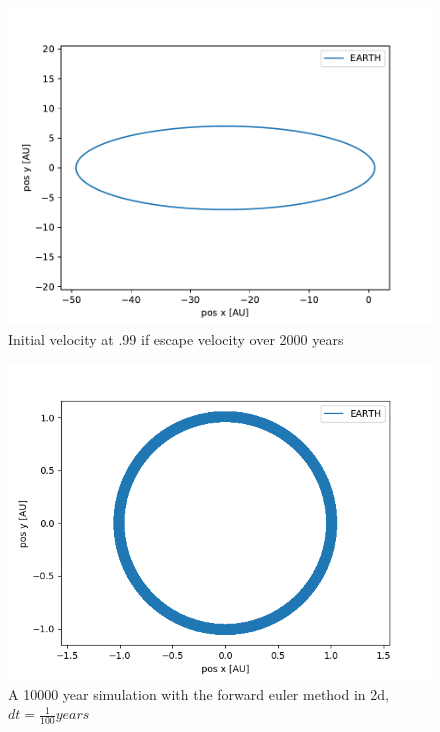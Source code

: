 \documentclass[a4paper]{article}
\begin{document}
	\begin{figure}[h!]
		\centering 
		\includegraphics[scale=0.7]{allmostEscapeVelocity2000.pdf}
		\caption{Initial velocity at .99 if escape velocity over 2000 years}
		\label{nescape_vel}
	\end{figure}
	
	\begin{figure}[h!]
		\centering 
		\includegraphics[scale=0.7]{fe1e4_2d.png}
		\caption{A 10000 year simulation with the forward euler method in 2d, $dt = \frac{1}{100}years$}
		\label{fe2d}
	\end{figure}
	
\end{document}
